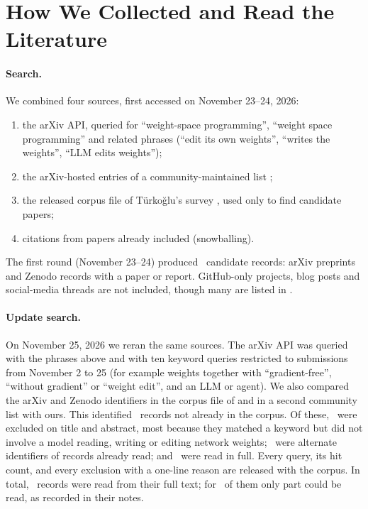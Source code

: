 \section{How We Collected and Read the Literature}
\label{app:method}

\paragraph{Search.} We combined four sources, first accessed on November 23--24, 2026:
\begin{enumerate}[leftmargin=*,itemsep=1pt]
\item the arXiv API, queried for ``weight-space programming'', ``weight space programming'' and related phrases (``edit its own weights'', ``writes the weights'', ``LLM edits weights'');
\item the arXiv-hosted entries of a community-maintained list \citep{savoji2026awesome};
\item the released corpus file of Türkoğlu's survey \citep{turkoglu2026survey}, used only to find candidate papers;
\item citations from papers already included (snowballing).
\end{enumerate}
The first round (November 23--24) produced \nFirstRound\ candidate records: arXiv preprints and Zenodo records with a paper or report. GitHub-only projects, blog posts and social-media threads are not included, though many are listed in \citet{savoji2026awesome}.

\paragraph{Update search.} On November 25, 2026 we reran the same sources. The arXiv API was queried with the phrases above and with ten keyword queries restricted to submissions from November 2 to 25 (for example weights together with ``gradient-free'', ``without gradient'' or ``weight edit'', and an LLM or agent). We also compared the arXiv and Zenodo identifiers in the corpus file of \citet{turkoglu2026survey} and in a second community list with ours. This identified \nUpdateIdentified\ records not already in the corpus. Of these, \nUpdateTitleExcluded\ were excluded on title and abstract, most because they matched a keyword but did not involve a model reading, writing or editing network weights; \nUpdateMerged\ were alternate identifiers of records already read; and \nUpdateFullText\ were read in full. Every query, its hit count, and every exclusion with a one-line reason are released with the corpus. In total, \nScreened\ records were read from their full text; for \nPartialAll\ of them only part could be read, as recorded in their notes.


